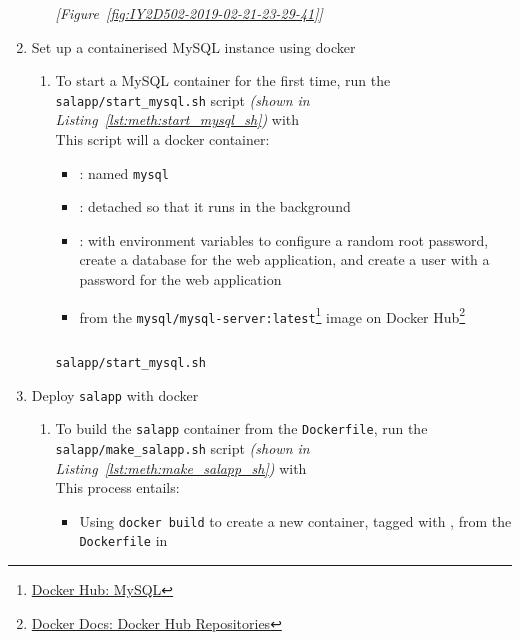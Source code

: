\begin{enumerate}[leftmargin=0em,label=\protect\listlabelcircle{\arabic*}]
\begin{enumerate}[label=\Roman*~\textcolor{light-gray}{|}]
      \textcolor{deep-gray}{\textit{[Figure~\ref{fig:IY2D502-2019-02-21-23-29-41}]}}
    \end{enumerate}
  \item Set up a containerised MySQL instance using docker
    \begin{enumerate}[label=\Roman*~\textcolor{light-gray}{|}]
      \item To start a MySQL container for the first time, run the \texttt{salapp/start\_mysql.sh} script \textit{(shown in Listing~\ref{lst:meth:start_mysql_sh})} with \\
        This script will  a docker container:
        \begin{itemize}
          \item {}: named \texttt{mysql}
          \item {}: detached so that it runs in the background
          \item {}: with environment variables to configure a random root password, create a database for the web application, and create a user with a password for the web application
          \item from the \texttt{mysql/mysql-server:latest}\footnote{\href{https://hub.docker.com/\_/mysql}{Docker Hub: MySQL}} image on Docker Hub\footnote{\href{https://docs.docker.com/docker-hub/repos/}{Docker Docs: Docker Hub Repositories}}
        \end{itemize}
        \begin{listing}[H]
          \captionsetup{skip=\skiplistingcaptionlen}
          \inputminted[breakanywhere]{bash}{../uswacs-2-iy2d502-salapp/start_mysql.sh}
          \caption{\texttt{salapp/start\_mysql.sh}}
          \label{lst:meth:start_mysql_sh}
        \end{listing}
    \end{enumerate}
  \item Deploy \texttt{salapp} with docker
    \begin{enumerate}[label=\Roman*~\textcolor{light-gray}{|}]
      \item To build the \texttt{salapp} container from the \texttt{Dockerfile}, run the \texttt{salapp/make\_salapp.sh} script \textit{(shown in Listing~\ref{lst:meth:make_salapp_sh})} with \\
        This process entails:
        \begin{itemize}
          \item Using \texttt{docker build} to create a new container, tagged with , from the \texttt{Dockerfile} in 

\end{itemize}
\end{enumerate}
\end{enumerate}
